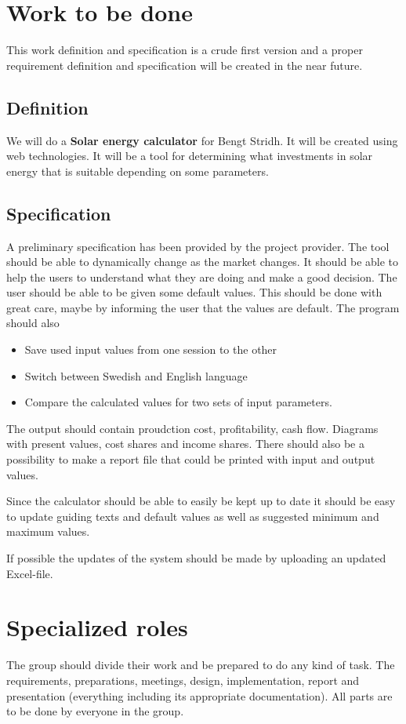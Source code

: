 \documentclass[]{article}
\begin{document}
\section{Work to be done}

This work definition and specification is a crude first version and a proper requirement definition and specification will be created in the near future.

\subsection{Definition}
We will do a \textbf{Solar energy calculator} for Bengt Stridh. It will be created using web technologies. It will be a tool for determining what investments in solar energy that is suitable depending on some parameters.

\subsection{Specification}

A preliminary specification has been provided by the project provider. The tool should be able to dynamically change as the market changes. It should be able to help the users to understand what they are doing and make a good decision. The user should be able to be given some default values. This should be done with great care, maybe by informing the user that the values are default. The program should also
\begin{itemize}
	\item Save used input values from one session to the other
	\item Switch between Swedish and English language
	\item Compare the calculated values for two sets of input parameters.
\end{itemize}
The output should contain proudction cost, profitability, cash flow. Diagrams with present values, cost shares and income shares. There should also be a possibility to make a report file that could be printed with input and output values.

Since the calculator should be able to easily be kept up to date it should be easy to update guiding texts and default values as well as suggested minimum and maximum values. 

If possible the updates of the system should be made by uploading an updated Excel-file. 


\section{Specialized roles}
The group should divide their work and be prepared to do any kind of task. The requirements, preparations, meetings, design, implementation, report and presentation (everything including its appropriate documentation). All parts are to be done by everyone in the group. 
\end{document}
